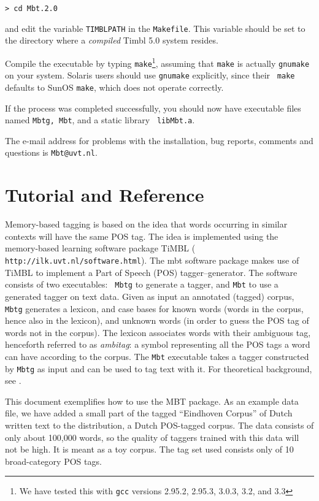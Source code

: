 \documentclass{report}
\begin{document}
{\tt > cd Mbt.2.0}

and edit the variable {\tt TIMBLPATH} in the {\tt Makefile}. This
variable should be set to the directory where a {\em compiled} Timbl
5.0 system resides.

Compile the executable by typing {\tt make}\footnote{We have
tested this with {\tt gcc} versions 2.95.2, 2.95.3, 3.0.3, 3.2, and 3.3},
assuming that {\tt make} is actually {\tt gnumake} on your system.
Solaris users should use {\tt gnumake} explicitly, since their {\tt
make} defaults to SunOS {\tt make}, which does not operate correctly.

If the process was completed successfully, you should now have
executable files named {\tt Mbtg, Mbt}, and a static library {\tt
libMbt.a}.

The e-mail address for problems with the installation, bug reports,
comments and questions is {\tt Mbt@uvt.nl}.

\chapter{Tutorial and Reference}
\label{tutorial}

Memory-based tagging is based on the idea that words occurring in
similar contexts will have the same POS tag. The idea is implemented
using the memory-based learning software package TiMBL ({\tt
http://ilk.uvt.nl/software.html}).  The {\sc mbt} software package
makes use of TiMBL to implement a Part of Speech (POS)
tagger--generator.  The software consists of two executables: {\tt
Mbtg} to generate a tagger, and {\tt Mbt} to use a generated tagger on
text data.  Given as input an annotated (tagged) corpus, {\tt Mbtg}
generates a lexicon, and case bases for known words (words in the
corpus, hence also in the lexicon), and unknown words (in order to
guess the POS tag of words not in the corpus). The lexicon associates
words with their ambiguous tag, henceforth referred to as {\em
ambitag}: a symbol representing all the POS tags a word can have
according to the corpus. The {\tt Mbt} executable takes a tagger
constructed by {\tt Mbtg} as input and can be used to tag text with
it.  For theoretical background, see \cite{Daelemans+96,Zavrel+99}.

This document exemplifies how to use the MBT package. As an example
data file, we have added a small part of the tagged ``Eindhoven
Corpus'' of Dutch written text \cite{Uitdenboogaard75} to the
distribution, a Dutch POS-tagged corpus. The data consists of only
about 100,000 words, so the quality of taggers trained with this data
will not be high. It is meant as a toy corpus. The tag set used
consists only of 10 broad-category POS tags.
\end{document}
